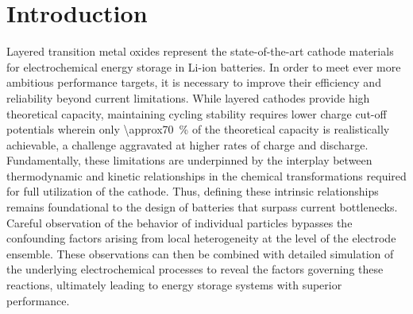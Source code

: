 \documentclass{WileyMSP-template}
\begin{document}
\glsresetall{}

\section{Introduction}

Layered transition metal oxides represent the state-of-the-art cathode
materials for electrochemical energy storage in Li-ion batteries. In
order to meet ever more ambitious performance targets, it is necessary
to improve their efficiency and reliability beyond current
limitations. While layered cathodes provide high theoretical capacity,
maintaining cycling stability requires lower charge cut-off potentials
wherein only \SI{\approx70}{\percent} of the theoretical capacity is
realistically achievable, a challenge aggravated at higher rates of
charge and discharge\cite{janek2019-2,chen2020-4}. Fundamentally,
these limitations are underpinned by the interplay between
thermodynamic and kinetic relationships in the chemical
transformations required for full utilization of the cathode. Thus,
defining these intrinsic relationships remains foundational to the
design of batteries that surpass current bottlenecks. Careful
observation of the behavior of individual particles bypasses the
confounding factors arising from local heterogeneity at the level of
the electrode ensemble. These observations can then be combined with
detailed simulation of the underlying electrochemical processes to
reveal the factors governing these reactions, ultimately leading to
energy storage systems with superior performance.

\end{document}
